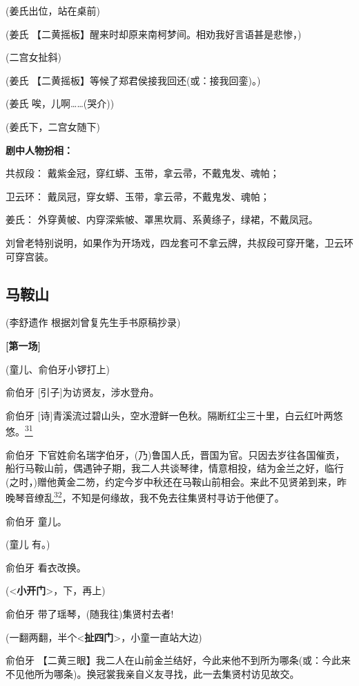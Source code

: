 (姜氏出位，站在桌前)

(姜氏 【二黄摇板】醒来时却原来南柯梦间。相劝我好言语甚是悲惨，)

(二宫女扯斜)

(姜氏 【二黄摇板】等候了郑君侯接我回还(或：接我回銮)。)

(姜氏 唉，儿啊\ldots{}\ldots{}(哭介))

(姜氏下，二宫女随下)

\textbf{剧中人物扮相：}

共叔段： 戴紫金冠，穿红蟒、玉带，拿云帚，不戴鬼发、魂帕；

卫云环： 戴凤冠，穿女蟒、玉带，拿云帚，不戴鬼发、魂帕；

姜氏： 外穿黄帔、内穿深紫帔、罩黑坎肩、系黄绦子，绿裙，不戴凤冠。

刘曾老特别说明，如果作为开场戏，四龙套可不拿云牌，共叔段可穿开氅，卫云环可穿宫装。

\hypertarget{ux9a6cux978dux5c71}{%
\subsection{马鞍山}\label{ux9a6cux978dux5c71}}

(李舒遗作 根据刘曾复先生手书原稿抄录)

\textbf{{[}第一场{]}}

(童儿、俞伯牙小锣打上)

俞伯牙 {[}引子{]}为访贤友，涉水登舟。

俞伯牙
{[}诗{]}青溪流过碧山头，空水澄鲜一色秋。隔断红尘三十里，白云红叶两悠悠。\protect\hyperlink{fn31}{\textsuperscript{31}}

俞伯牙
下官姓俞名瑞字伯牙，(乃)鲁国人氏，晋国为官。只因去岁往各国催贡，船行马鞍山前，偶遇钟子期，我二人共谈琴律，情意相投，结为金兰之好，临行(之时，)赠他黄金二笏，约定今岁中秋还在马鞍山前相会。来此不见贤弟到来，昨晚琴音缭乱\protect\hyperlink{fn32}{\textsuperscript{32}}，不知是何缘故，我不免去往集贤村寻访于他便了。

俞伯牙 童儿。

(童儿 有。)

俞伯牙 看衣改换。

(\textless{}\textbf{小开门}\textgreater{}，下，再上)

俞伯牙 带了瑶琴，(随我往)集贤村去者!

(一翻两翻，半个\textless{}\textbf{扯四门}\textgreater{}，小童一直站大边)

俞伯牙
【二黄三眼】我二人在山前金兰结好，今此来他不到所为哪条(或：今此来不见他所为哪条)。换冠裳我亲自义友寻找，此一去集贤村访见故交。

